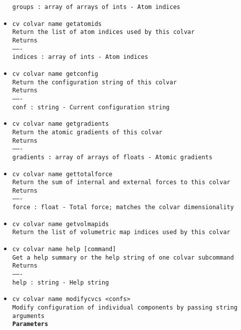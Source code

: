 \begin{itemize}
\texttt{groups : array of arrays of ints - Atom indices}
\item \texttt{cv colvar name getatomids}
\\
\texttt{Return the list of atom indices used by this colvar}
\\
\texttt{Returns}
\\
\texttt{-------}
\\
\texttt{indices : array of ints - Atom indices}
\item \texttt{cv colvar name getconfig}
\\
\texttt{Return the configuration string of this colvar}
\\
\texttt{Returns}
\\
\texttt{-------}
\\
\texttt{conf : string - Current configuration string}
\item \texttt{cv colvar name getgradients}
\\
\texttt{Return the atomic gradients of this colvar}
\\
\texttt{Returns}
\\
\texttt{-------}
\\
\texttt{gradients : array of arrays of floats - Atomic gradients}
\item \texttt{cv colvar name gettotalforce}
\\
\texttt{Return the sum of internal and external forces to this colvar}
\\
\texttt{Returns}
\\
\texttt{-------}
\\
\texttt{force : float - Total force; matches the colvar dimensionality}
\item \texttt{cv colvar name getvolmapids}
\\
\texttt{Return the list of volumetric map indices used by this colvar}
\item \texttt{cv colvar name help [command]}
\\
\texttt{Get a help summary or the help string of one colvar subcommand}
\\
\texttt{Returns}
\\
\texttt{-------}
\\
\texttt{help : string - Help string}
\item \texttt{cv colvar name modifycvcs <confs>}
\\
\texttt{Modify configuration of individual components by passing string arguments}
\\
\texttt{\textbf{Parameters}}
\\

\end{itemize}
